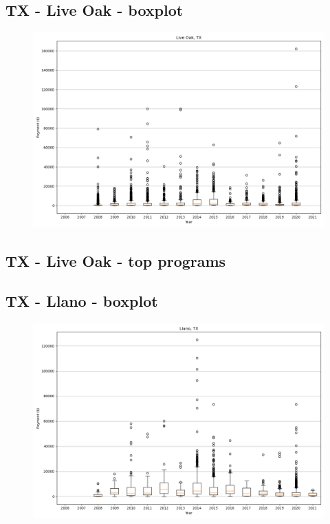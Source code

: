 \subsection*{TX - Live Oak - boxplot}
\begin{figure}[h]
\centering
\includegraphics[width=7in]{../output/boxplots/counties/Live Oak-TX_boxplot.png}
\end{figure}


\subsection*{TX - Live Oak - top programs}

\newpage
\subsection*{TX - Llano - boxplot}
\begin{figure}[h]
\centering
\includegraphics[width=7in]{../output/boxplots/counties/Llano-TX_boxplot.png}
\end{figure}


